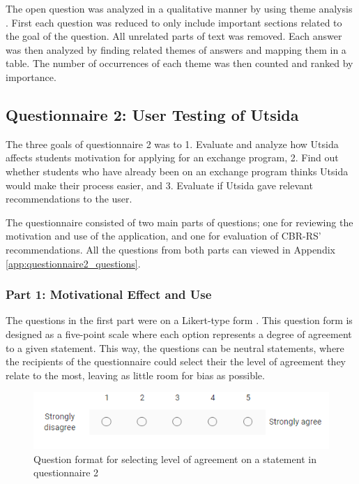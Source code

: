 The open question was analyzed in a qualitative manner by using theme analysis \cite{oates2005researching}. First each question was reduced to only include important sections related to the goal of the question. All unrelated parts of text was removed. Each answer was then analyzed by finding related themes of answers and mapping them in a table. The number of occurrences of each theme was then counted and ranked by importance.

\subsection{Questionnaire 2: User Testing of Utsida}\label{sec:questionnaire_2}

The three goals of questionnaire 2 was to 1. Evaluate and analyze how Utsida affects students motivation for applying for an exchange program, 2. Find out whether students who have already been on an exchange program thinks Utsida would make their process easier, and 3. Evaluate if Utsida gave relevant recommendations to the user.

The questionnaire consisted of two main parts of questions; one for reviewing the motivation and use of the application, and one for evaluation of CBR-RS' recommendations. All the questions from both parts can viewed in Appendix \ref{app:questionnaire2_questions}.

\subsubsection{Part 1: Motivational Effect and Use}
The questions in the first part were on a Likert-type form \cite{likert1932technique}. This question form is designed as a five-point scale where each option represents a degree of agreement to a given statement. This way, the questions can be neutral statements, where the recipients of the questionnaire could select their the level of agreement they relate to the most, leaving as little room for bias as possible. 

\begin{figure}[H]
    \centering
    \includegraphics[width=1\textwidth]{fig/q2_question_form.PNG}
    \caption[Question format for selecting level of agreement on a statement]{Question format for selecting level of agreement on a statement in questionnaire 2}
    \label{fig:q2_question_form}
\end{figure}

